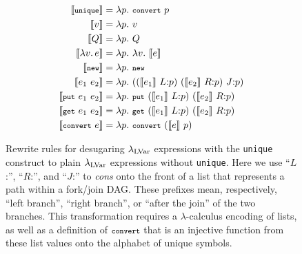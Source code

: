 \begin{figure}
\footnotesize
    \begin{align*}
      \llbracket{\mbox{\footnotesize \texttt{unique}}}\rrbracket         &= \lambda p .~ \mbox{\footnotesize \texttt{convert}}~p \\
      \llbracket{v}\rrbracket               &= \lambda p .~ v \\
      \llbracket{Q}\rrbracket              &= \lambda p .~ Q \\     
      \llbracket{\ensuremath{\lambda v.\,e}}\rrbracket     &= \lambda p .~ \lambda v .~ \llbracket{e}\rrbracket \\
      \llbracket{\mbox{\footnotesize \texttt{new}}}\rrbracket           &= \lambda p .~ \mbox{\footnotesize \texttt{new}} \\
      \llbracket{\ensuremath{e_1~e_2}}\rrbracket   &= \lambda p .~ ((\llbracket{e_1}\rrbracket ~ {L}{:}p)~(\llbracket{e_2}\rrbracket ~ {R}{:}p)~{J}{:}p) \\
      \llbracket{\ensuremath{\mbox{\footnotesize \texttt{put}}~e_1~e_2}}\rrbracket  &= \lambda p .~ \mbox{\footnotesize \texttt{put}}~(\llbracket{e_1}\rrbracket~{L}{:}p)~(\llbracket{e_2}\rrbracket~{R}{:}p) \\
      \llbracket{\ensuremath{\mbox{\footnotesize \texttt{get}}~e_1~e_2}}\rrbracket  &= \lambda p .~ \mbox{\footnotesize \texttt{get}}~(\llbracket{e_1}\rrbracket~{L}{:}p)~(\llbracket{e_2}\rrbracket~{R}{:}p) \\
      \llbracket{\ensuremath{\mbox{\footnotesize \texttt{convert}}~e}}\rrbracket    &= \lambda p .~ \mbox{\footnotesize \texttt{convert}}~(\llbracket{e}\rrbracket~p) 
    \end{align*}
  \caption{\footnotesize Rewrite rules for desugaring $\textup{\ensuremath{\lambda_{\textrm{LVar}}}}$ expressions with the \lstinline|unique| construct to plain $\textup{\ensuremath{\lambda_{\textrm{LVar}}}}$ expressions without \lstinline|unique|.  Here we use ``$L$:'', ``$R$:'', and ``$J$:'' to
    {\em cons} onto the front of a list that represents a path within
    a fork/join DAG.  These prefixes mean, respectively, ``left branch'',
    ``right branch'', or ``after the join'' of the two branches.
%
    This transformation requires a $\lambda$-calculus encoding of lists, as well as a definition
    of $\mbox{\footnotesize \texttt{convert}}$ that is an injective function from these list values
    onto the alphabet of unique symbols.
%
}
  \label{f:desugar}
\end{figure}

